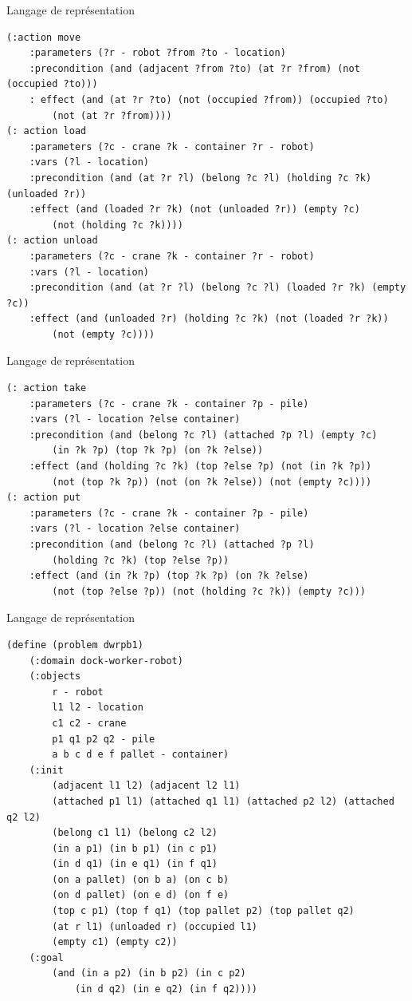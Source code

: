 \documentclass[compress]{beamer}
\begin{document}
\begin{frame}[containsverbatim]{Langage de représentation}
\begin{lstlisting}
(:action move
	:parameters (?r - robot ?from ?to - location)
	:precondition (and (adjacent ?from ?to) (at ?r ?from) (not (occupied ?to)))
	: effect (and (at ?r ?to) (not (occupied ?from)) (occupied ?to)
		(not (at ?r ?from))))
(: action load
	:parameters (?c - crane ?k - container ?r - robot)
	:vars (?l - location)
	:precondition (and (at ?r ?l) (belong ?c ?l) (holding ?c ?k) (unloaded ?r))
	:effect (and (loaded ?r ?k) (not (unloaded ?r)) (empty ?c)
		(not (holding ?c ?k))))
(: action unload
	:parameters (?c - crane ?k - container ?r - robot)
	:vars (?l - location)
	:precondition (and (at ?r ?l) (belong ?c ?l) (loaded ?r ?k) (empty ?c))
	:effect (and (unloaded ?r) (holding ?c ?k) (not (loaded ?r ?k))
		(not (empty ?c))))
\end{lstlisting}
\end{frame}

\begin{frame}[containsverbatim]{Langage de représentation}
\begin{lstlisting}
(: action take
	:parameters (?c - crane ?k - container ?p - pile)
	:vars (?l - location ?else container)
	:precondition (and (belong ?c ?l) (attached ?p ?l) (empty ?c)
		(in ?k ?p) (top ?k ?p) (on ?k ?else))
	:effect (and (holding ?c ?k) (top ?else ?p) (not (in ?k ?p))
		(not (top ?k ?p)) (not (on ?k ?else)) (not (empty ?c))))
(: action put
	:parameters (?c - crane ?k - container ?p - pile)
	:vars (?l - location ?else container)
	:precondition (and (belong ?c ?l) (attached ?p ?l)
		(holding ?c ?k) (top ?else ?p))
	:effect (and (in ?k ?p) (top ?k ?p) (on ?k ?else)
		(not (top ?else ?p)) (not (holding ?c ?k)) (empty ?c)))
\end{lstlisting}
\end{frame}

\begin{frame}[containsverbatim]{Langage de représentation}
\begin{lstlisting}
(define (problem dwrpb1)
	(:domain dock-worker-robot)
	(:objects
		r - robot
		l1 l2 - location
		c1 c2 - crane
		p1 q1 p2 q2 - pile
		a b c d e f pallet - container)
	(:init
		(adjacent l1 l2) (adjacent l2 l1)
		(attached p1 l1) (attached q1 l1) (attached p2 l2) (attached q2 l2)
		(belong c1 l1) (belong c2 l2)
		(in a p1) (in b p1) (in c p1)
		(in d q1) (in e q1) (in f q1)
		(on a pallet) (on b a) (on c b)
		(on d pallet) (on e d) (on f e)
		(top c p1) (top f q1) (top pallet p2) (top pallet q2)
		(at r l1) (unloaded r) (occupied l1)
		(empty c1) (empty c2))
	(:goal
		(and (in a p2) (in b p2) (in c p2)
			(in d q2) (in e q2) (in f q2))))
\end{lstlisting}
\end{frame}
\end{document}
